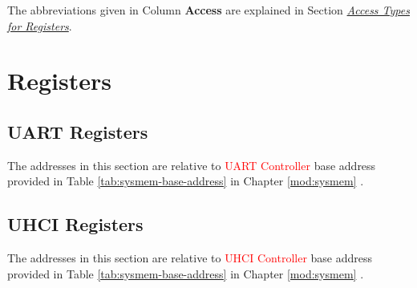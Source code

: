 \documentclass[main\_\_EN.tex]{subfiles}
\begin{document}
The abbreviations given in Column \textbf{Access} are explained in Section \hyperref[glossary-access-types]{\textit{Access Types for Registers}}.






\clearpage
\section{Registers}

\subsection{UART Registers}

The addresses in this section are relative to \textcolor{red}{UART Controller} base address provided in Table \ref{tab:sysmem-base-address} in Chapter \ref{mod:sysmem} \textit{}.



\subsection{UHCI Registers}

The addresses in this section are relative to \textcolor{red}{UHCI Controller} base address provided in Table \ref{tab:sysmem-base-address} in Chapter \ref{mod:sysmem} \textit{}.


\end{document}
